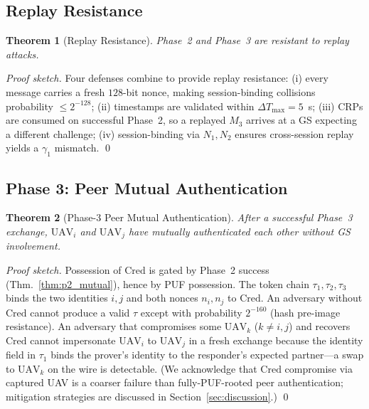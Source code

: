 \documentclass[journal,a4paper,10pt]{IEEEtran}
\newtheorem{theorem}{Theorem}
\begin{document}
\subsection{Replay Resistance}
\begin{theorem}[Replay Resistance]
\label{thm:replay}
Phase~2 and Phase~3 are resistant to replay attacks.
\end{theorem}
\begin{proof}[Proof sketch]
Four defenses combine to provide replay resistance:
(i) every message carries a fresh $128$-bit nonce, making
session-binding collisions probability $\le 2^{-128}$;
(ii) timestamps are validated within $\Delta T_{\max} = 5$~s;
(iii) CRPs are consumed on successful Phase~2, so a replayed $M_3$
arrives at a GS expecting a different challenge;
(iv) session-binding via $N_1, N_2$ ensures cross-session replay
yields a $\gamma_1$ mismatch.
\qed
\end{proof}

\subsection{Phase 3: Peer Mutual Authentication}
\begin{theorem}[Phase-3 Peer Mutual Authentication]
\label{thm:p3_peer}
After a successful Phase~3 exchange, $\mathrm{UAV}_i$ and
$\mathrm{UAV}_j$ have mutually authenticated each other without GS
involvement.
\end{theorem}
\begin{proof}[Proof sketch]
Possession of $\mathrm{Cred}$ is gated by Phase~2 success
(Thm.~\ref{thm:p2_mutual}), hence by PUF possession. The token chain
$\tau_1, \tau_2, \tau_3$ binds the two identities $i, j$ and both
nonces $n_i, n_j$ to $\mathrm{Cred}$. An adversary without
$\mathrm{Cred}$ cannot produce a valid $\tau$ except with probability
$2^{-160}$ (hash pre-image resistance). An adversary that compromises
some $\mathrm{UAV}_k$ ($k \neq i, j$) and recovers $\mathrm{Cred}$
cannot impersonate $\mathrm{UAV}_i$ to $\mathrm{UAV}_j$ in a fresh
exchange because the identity field in $\tau_1$ binds the prover's
identity to the responder's expected partner---a swap to
$\mathrm{UAV}_k$ on the wire is detectable. (We acknowledge that
$\mathrm{Cred}$ compromise via captured UAV is a coarser failure than
fully-PUF-rooted peer authentication; mitigation strategies are
discussed in Section~\ref{sec:discussion}.) \qed
\end{proof}
\end{document}
